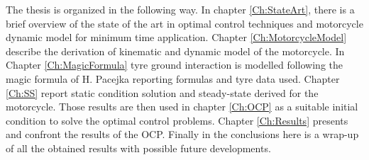 The thesis is organized in the following way. 
In chapter \ref{Ch:StateArt}, there is a brief overview of the state of the art in optimal control techniques and motorcycle dynamic model for minimum time application.
Chapter \ref{Ch:MotorcycleModel} describe the derivation of kinematic and dynamic model of the motorcycle. 
In Chapter \ref{Ch:MagicFormula} tyre ground interaction is modelled following the magic formula of H. Pacejka\cite{pacejka2012tire} reporting formulas and tyre data used.
Chapter \ref{Ch:SS} report static condition solution and steady-state derived for the motorcycle. Those results are then used in chapter \ref{Ch:OCP} as a suitable initial condition to solve the optimal control problems.  
Chapter \ref{Ch:Results} presents and confront the results of the OCP.
Finally in the conclusions here is a wrap-up of all the obtained results with possible future developments.